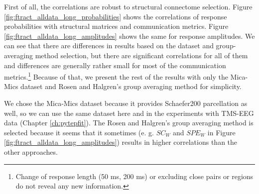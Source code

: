 First of all, the correlations are robust to structural connectome selection. Figure \ref{fig:ftract_alldata_long_probabilities} shows the correlations of response probabilities with structural matrices and communication metrics. Figure \ref{fig:ftract_alldata_long_amplitudes} shows the same for response amplitudes. We can see that there are differences in results based on the dataset and group-averaging method selection, but there are significant correlations for all of them and differences are generally rather small for most of the communication metrics.\footnote{Change of response length (50 ms, 200 ms) or excluding close pairs or regions do not reveal any new information.} Because of that, we present the rest of the results with only the Mica-Mics dataset and Rosen and Halgren's group averaging method for simplicity. 

We chose the Mica-Mics dataset because it provides Schaefer200 parcellation as well, so we can use the same dataset here and in the experiments with TMS-EEG data (Chapter \ref{ch:pytepfit}). The Rosen and Halgren's group averaging method is selected because it seems that it sometimes (e. g. $SC_W$ and $SPE_W$ in Figure \ref{fig:ftract_alldata_long_amplitudes}) results in higher correlations than the other approaches.

